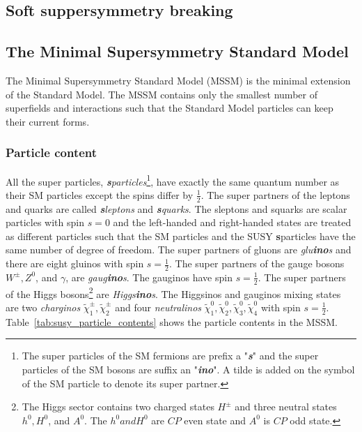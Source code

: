 
\subsection{Soft suppersymmetry breaking}

\subsection{The Minimal Supersymmetry Standard Model}
\label{subsec:susy_mssm}
The Minimal Supersymmetry Standard Model (MSSM) is the minimal extension of the Standard Model.
The MSSM contains only the smallest number of superfields and interactions such that the Standard Model particles can keep their current forms.


\subsubsection{Particle content}
\label{subsubsec:susy_particle_content}
All the super particles, \textit{\textbf{s}particles}\footnote{The super particles of the SM fermions are prefix a "\textit{\textbf{s}}" and the super particles of the SM bosons are suffix an "\textit{\textbf{ino}}". A tilde is added on the symbol of the SM particle to denote its super partner.}, have exactly the same quantum number as their SM particles except the spins differ by $\frac{1}{2}$.
The super partners of the leptons and quarks are called \textit{\textbf{s}leptons} and \textit{\textbf{s}quarks}.
The sleptons and squarks are scalar particles with spin $s=0$ and the left-handed and right-handed states are treated as different particles such that the SM particles and the SUSY \textbf{s}particles have the same number of degree of freedom.
The super partners of gluons are \textit{glu\textbf{ino}s} and there are eight gluinos with spin $s=\frac{1}{2}$. 
The super partners of the gauge bosons $W^{\pm}, Z^{0}$, and $\gamma$, are \textit{gaug\textbf{ino}s}.
The gauginos have spin $s = \frac{1}{2}$.
The super partners of the Higgs bosons\footnote{The Higgs sector contains two charged states $H^{\pm}$ and three neutral states $h^{0}, H^{0}$, and $A^{0}$. The $h^{0} and H^{0}$ are $CP$ even state and $A^{0}$ is $CP$ odd state.} are \textit{Higgs\textbf{ino}s}.
The Higgsinos and gauginos mixing states are two \textit{charginos} $\tilde{\chi}_{1}^{\pm}, \tilde{\chi}_{2}^{\pm}$ and four \textit{neutralinos} $\tilde{\chi}_{1}^{0}, \tilde{\chi}_{2}^{0}, \tilde{\chi}_{3}^{0}, \tilde{\chi}_{4}^{0}$ with spin $s=\frac{1}{2}$.
Table~\ref{tab:susy_particle_contents} shows the particle contents in the MSSM.

